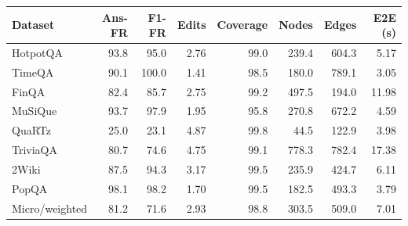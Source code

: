 \begin{tabular}{lrrrrrrr}
\toprule
Dataset & Ans-FR & F1-FR & Edits & Coverage & Nodes & Edges & E2E (s) \\
\midrule
HotpotQA & 93.8 & 95.0 & 2.76 & 99.0 & 239.4 & 604.3 & 5.17 \\
TimeQA & 90.1 & 100.0 & 1.41 & 98.5 & 180.0 & 789.1 & 3.05 \\
FinQA & 82.4 & 85.7 & 2.75 & 99.2 & 497.5 & 194.0 & 11.98 \\
MuSiQue & 93.7 & 97.9 & 1.95 & 95.8 & 270.8 & 672.2 & 4.59 \\
QuaRTz & 25.0 & 23.1 & 4.87 & 99.8 & 44.5 & 122.9 & 3.98 \\
TriviaQA & 80.7 & 74.6 & 4.75 & 99.1 & 778.3 & 782.4 & 17.38 \\
2Wiki & 87.5 & 94.3 & 3.17 & 99.5 & 235.9 & 424.7 & 6.11 \\
PopQA & 98.1 & 98.2 & 1.70 & 99.5 & 182.5 & 493.3 & 3.79 \\
\midrule
Micro/weighted & 81.2 & 71.6 & 2.93 & 98.8 & 303.5 & 509.0 & 7.01 \\
\bottomrule
\end{tabular}
